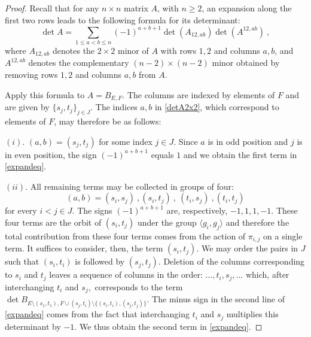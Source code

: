 \documentclass[10pt]{amsart}
\theoremstyle{plain}
\newcommand{\0}{\color{blue}{\mathsf{0}}}
\begin{document}
\begin{proof}
Recall that for any $n\times n$ matrix $A$, with $n\geq 2$, an expansion along the first two rows leads to  the following formula for its  determinant:
\begin{equation}  \label{detA2x2}
\det A = \sum_{1\leq a<b\leq n}  (-1)^{a+b+1} \det(A_{12,ab}) \det(A^{12,ab})\ ,
\end{equation}
where $A_{12,ab}$ denotes the $2\times 2$ minor of $A$ with rows $1,2$ and columns $a,b$, and $A^{12,ab}$ denotes the complementary $(n-2)\times(n-2)$ minor obtained by removing rows $1,2$ and columns $a,b$ from $A$. 

Apply this formula to $A= B_{E,F}$. The columns are indexed by elements of $F$ and are given by $\{s_j, t_j\}_{j\in J}.$  The  indices $a,b$ in \eqref{detA2x2}, which correspond to elements of $F$, may therefore be as follows:

$(i).$  $(a,b) = (s_j,t_j)$ for some index $j\in J$. Since $a$ is in odd position and $j$ is in even position, the sign $(-1)^{a+b+1}$ equals $1$ and we obtain the first term in \eqref{expandeq}. 

$(ii).$ All remaining terms may be collected in groups of  four:
\[  (a,b) =  (s_i, s_j) \ , (s_i, t_j) \ , \ (t_i, s_j) \ , (t_i, t_j) \]
for every  $i<j \in J$.  The signs $(-1)^{a+b+1}$ are, respectively,  $-1,1,1,-1$. These four terms are the orbit of $(s_i,t_j)$ under the group $\langle g_i,g_j\rangle$ and therefore the total contribution from these four terms comes from the action of $\pi_{i,j}$ on a single term. It suffices to consider, then, the term  $(s_i,t_j)$.
We may order the pairs in $J$ such that $(s_i,t_i)$ is followed by $(s_j,t_j)$. 
Deletion of the columns corresponding to $s_i$ and $t_j$  leaves a sequence of columns  in the order: $\ldots,t_i,s_j,\ldots$  which, after interchanging $t_i$ and $s_j,$ corresponds to the  term 
$\det B_{E\setminus (s_1,t_1),F\cup (s_j,t_i)\setminus \{(s_i,t_i),(s_j,t_j)\}}$. The minus sign in the second line of \eqref{expandeq} comes from the fact that  interchanging $t_i$ and $s_j$ multiplies this determinant by $-1$. 
We thus obtain the second term in \eqref{expandeq}.
\end{proof}
\end{document}
